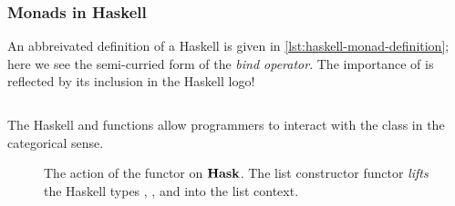 \subsubsection{Monads in Haskell} An abbreivated definition of a Haskell
 is given in \autoref{lst:haskell-monad-definition}; here we
see the semi-curried form of the \emph{bind operator}. The importance of
\inlinehask{>>=} is reflected by its inclusion in the Haskell logo!
\vspace{-.5em} %
\begin{listing}
        \inputminted{haskell}{haskell/Monad.hs}%
        \caption{The Haskell \protect\inlinehask{>>=} and
                \protect{} functions allow programmers to
                interact with the \protect{} class in the
                categorical sense.}
        \label{lst:haskell-monad-definition}
\end{listing}

\begin{figure}[ht]
        \vspace{\belowcaptionskip}
        \caption{The action of the \inlinehask{[]} functor on $\operatorname{\mathbf{Hask}}$. The
                list constructor functor \emph{lifts} the Haskell types
                \protect{}, \protect{}, and
                \protect{} into the list context.}
        \label{fig:functor-list-map}
\end{figure}

